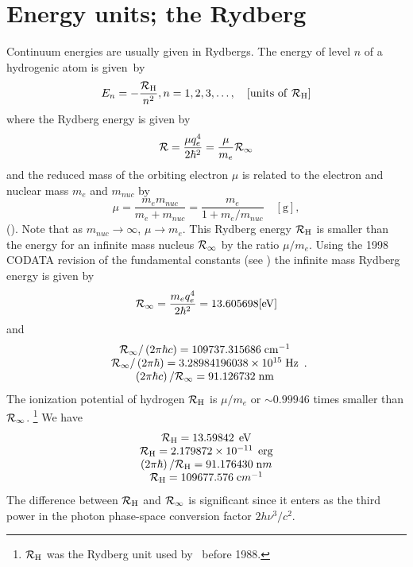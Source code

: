 \section{Energy units; the Rydberg}

Continuum energies are usually given in Rydbergs.
The energy of level
$n$ of a hydrogenic atom is given~by
\begin{equation}
{E_n} =  - \frac{{\cal R}_{\mathrm{H}}}{{{n^2}}}, n = 1,2,3,\ldots,\quad [\mathrm{units\ of\
}\mathcal{R}_{\mathrm{H}}]
\end{equation}
where the Rydberg energy is given by
\begin{equation}
{\cal R} = \frac{{\mu q_e^4}}{{2{\hbar ^2}}} = \frac{\mu }{{{m_e}}}{{\cal
R}_\infty }
\end{equation}
and the reduced mass of the orbiting electron $\mu$ is related
to the electron
and nuclear mass $m_e$ and $m_{nuc}$ by
\begin{equation}
\mu  = \frac{{{m_e}{m_{nuc}}}}{{{m_e} + {m_{nuc}}}} = \frac{{{m_e}}}{{1
+ {{{m_e}} /{{m_{nuc}}}}}}\quad  [\mathrm{g}],%
\end{equation}
(\citealp{Friedrich1998}).
Note that as ${m_{nuc}} \to \infty $, $\mu  \to {m_e}$.
This Rydberg energy $\cal{R}_{\mathrm{H}}$ is smaller than
the energy for an infinite mass
nucleus $\cal{R}_\infty$  by the ratio $\mu/m_e$.
Using the 1998 CODATA revision of the
fundamental constants (see \citealp{Cohen1987,Mohr1998}) the
infinite mass Rydberg energy is given by
\begin{equation}
{{\cal R}_\infty } = \frac{{{m_e}q_e^4}}{{2{\hbar ^2}}} = 13.605698
  [\mathrm{eV}]
\end{equation}
and
\begin{equation}
\begin{array}{c}
 {{\cal R}_\infty }/\left( {2\pi \hbar c} \right) =
109737.315686\;{\mathrm{c}}{{\mathrm{m}}^{ - 1}} \\
 {{\cal R}_\infty }/\left( {2\pi \hbar } \right) = 3.28984196038 \times
{10^{15}}\;{\mathrm{Hz}} \\
 \left( {2\pi \hbar c} \right)/{{\cal R}_\infty } = 91.126732\;{\mathrm{nm}} \\
 \end{array}.
\end{equation}
The ionization potential of hydrogen $\cal{R}_{\mathrm{H}}$ is  $\mu/m_e$ or
$\sim 0.99946$ times
smaller than $\cal{R}_\infty$.
\footnote{$\cal{R}_{\mathrm{H}}$ was the Rydberg unit used by \Cloudy\ before 1988.}
We have
\begin{equation}
\begin{array}{c}
{\cal{R}_{\mathrm{H}}} = 13.59842\;{\rm\thinspace eV}\\
{\cal{R}_{\mathrm{H}}} = 2.179872\times 10^{-11}\;{\rm\thinspace erg}\\
\left( 2\pi \hbar\right)/{\cal{R}_{\mathrm{H}}} = 91.176430\;{\mathrm nm}\\
{\cal{R}_{\mathrm{H}}} = 109677.576\;{\mathrm cm}^{-1}
\end{array}
\end{equation}
The difference between $\cal{R}_{\mathrm{H}}$ and $\cal{R}_\infty$ is
significant since it enters as the third
power in the photon phase-space conversion factor $2h \nu^3/c^2$.


